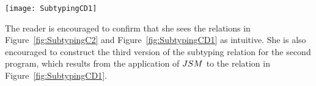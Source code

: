 \documentclass[twocolumn,english]{article}
\numberwithin{equation}{section}
\numberwithin{figure}{section}
\begin{document}
\begin{figure*}
\noindent \begin{centering}
\texttt{[image: SubtypingCD1]}
\par\end{centering}

\protect\caption{\label{fig:SubtypingCD1}Subtyping between rank 0 and 1 types (with
two generic classes)}
\end{figure*}


The reader is encouraged to confirm that she sees the relations in
Figure~\ref{fig:SubtypingC2} and Figure~\ref{fig:SubtypingCD1}
as intuitive. She is also encouraged to construct the third version
of the subtyping relation for the second program, which results from
the application of $JSM$ to the relation in Figure~\ref{fig:SubtypingCD1}.
\end{document}
